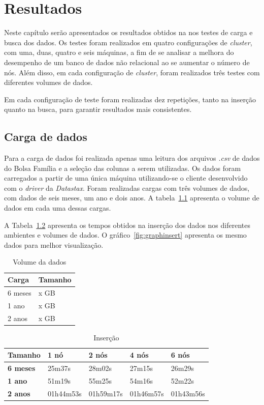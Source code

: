 \chapter{Resultados}

Neste capítulo serão apresentados os resultados obtidos na nos testes de carga e busca dos dados. Os testes foram realizados em quatro configurações de \emph{cluster}, com uma, duas, quatro e seis máquinas, a fim de se analisar a melhora do desempenho de um banco de dados não relacional ao se aumentar o número de nós. Além disso, em cada configuração de \emph{cluster}, foram realizados três testes com diferentes volumes de dados. 

Em cada configuração de teste foram realizadas dez repetições, tanto na inserção quanto na busca, para garantir resultados mais consistentes. 

\section{Carga de dados}
Para a carga de dados foi realizada apenas uma leitura dos arquivos \emph{.csv} de dados do Bolsa Família e a seleção das colunas a serem utilizadas. Os dados foram carregados a partir de uma única máquina utilizando-se o cliente desenvolvido com o \emph{driver} da \emph{Datastax}. Foram realizadas cargas com três volumes de dados, com dados de seis meses, um ano e dois anos. A tabela~\ref{tab:volume} apresenta o volume de dados em cada uma dessas cargas.

A Tabela~\ref{tb_insert} apresenta os tempos obtidos na inserção dos dados nos diferentes ambientes e volumes de dados. O gráfico~\ref{fig:graphinsert} apresenta os mesmo dados para melhor visualização.

\begin{table}[]
	\centering
	\caption{Volume da dados}
	\label{tab:volume}
	\begin{tabular}{ll}
		\textbf{Carga} & \textbf{Tamanho} \\ \hline
		6 meses        & x GB             \\ \hline
		1 ano          & x GB             \\ \hline
		2 anos         & x GB             \\ \hline
	\end{tabular}
\end{table}

\begin{table}[]
	\centering
	\caption{Inserção}
	\label{tb_insert}
	\begin{tabular}{lllll}
		\textbf{Tamanho}	& \textbf{1 nó} & \textbf{2 nós} & \textbf{4 nós} & \textbf{6 nós} \\ \hline
		\textbf{6 meses}    & 25m37s        & 28m02s         & 27m15s         & 26m29s         \\ \hline
		\textbf{1 ano}      & 51m19s        & 55m25s         & 54m16s         & 52m22s         \\ \hline
		\textbf{2 anos}     & 01h44m53s     & 01h59m17s      & 01h46m57s      & 01h43m56s      \\ \hline
	\end{tabular}
\end{table}

